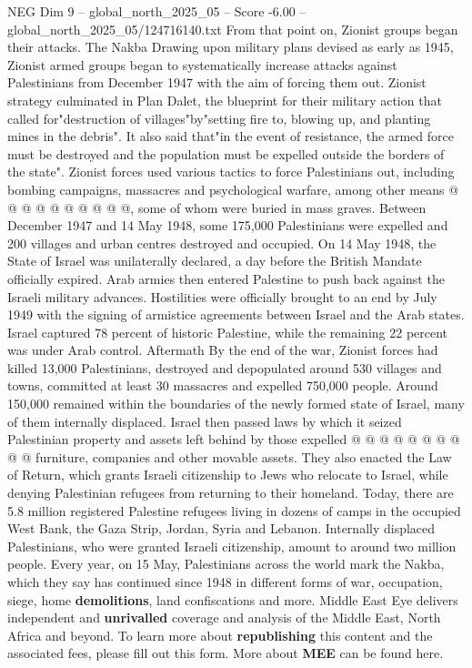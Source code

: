\begin{textsample}{NEG Dim 9 – global\_north\_2025\_05 – Score -6.00 – global\_north\_2025\_05/124716140.txt}
From that point on, Zionist groups began their attacks.
The Nakba Drawing upon military plans devised as early as 1945, Zionist armed groups began to systematically increase attacks against Palestinians from December 1947 with the aim of forcing them out.
Zionist strategy culminated in Plan Dalet, the blueprint for their military action that called for"destruction of villages"by"setting fire to, blowing up, and planting mines in the debris".
It also said that"in the event of resistance, the armed force must be destroyed and the population must be expelled outside the borders of the state".
Zionist forces used various tactics to force Palestinians out, including bombing campaigns, massacres and psychological warfare, among other means @ @ @ @ @ @ @ @ @ @, some of whom were buried in mass graves.
Between December 1947 and 14 May 1948, some 175,000 Palestinians were expelled and 200 villages and urban centres destroyed and occupied.
On 14 May 1948, the State of Israel was unilaterally declared, a day before the British Mandate officially expired.
Arab armies then entered Palestine to push back against the Israeli military advances.
Hostilities were officially brought to an end by July 1949 with the signing of armistice agreements between Israel and the Arab states.
Israel captured 78 percent of historic Palestine, while the remaining 22 percent was under Arab control.
Aftermath By the end of the war, Zionist forces had killed 13,000 Palestinians, destroyed and depopulated around 530 villages and towns, committed at least 30 massacres and expelled 750,000 people.
Around 150,000 remained within the boundaries of the newly formed state of Israel, many of them internally displaced.
Israel then passed laws by which it seized Palestinian property and assets left behind by those expelled @ @ @ @ @ @ @ @ @ @ furniture, companies and other movable assets.
They also enacted the Law of Return, which grants Israeli citizenship to Jews who relocate to Israel, while denying Palestinian refugees from returning to their homeland.
Today, there are 5.8 million registered Palestine refugees living in dozens of camps in the occupied West Bank, the Gaza Strip, Jordan, Syria and Lebanon.
Internally displaced Palestinians, who were granted Israeli citizenship, amount to around two million people.
Every year, on 15 May, Palestinians across the world mark the Nakba, which they say has continued since 1948 in different forms of war, occupation, siege, home \textbf{demolitions}, land confiscations and more.
Middle East Eye delivers independent and \textbf{unrivalled} coverage and analysis of the Middle East, North Africa and beyond.
To learn more about \textbf{republishing} this content and the associated fees, please fill out this form.
More about \textbf{MEE} can be found here.

\end{textsample}
